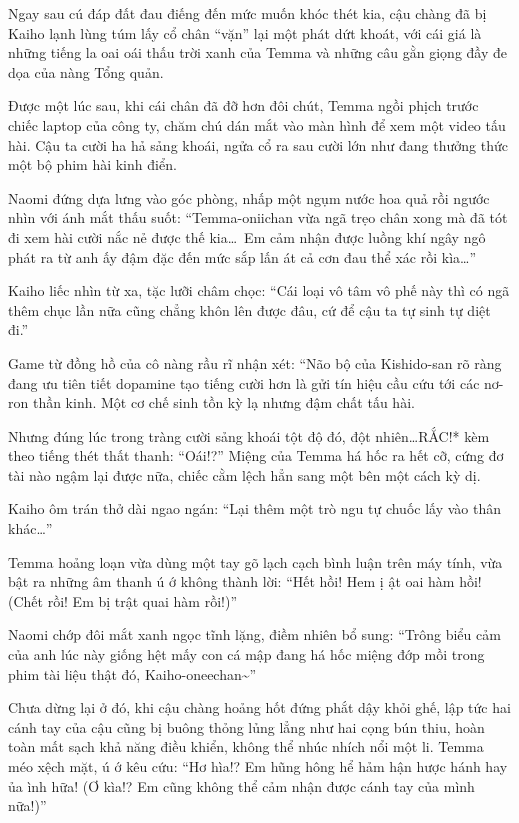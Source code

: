 \documentclass[../main.tex]{subfiles}
\begin{document}
Ngay sau cú đáp đất đau điếng đến mức muốn khóc thét kia, cậu chàng đã bị Kaiho lạnh lùng túm lấy cổ chân ``vặn'' lại một phát dứt khoát, với cái giá là những tiếng la oai oái thấu trời xanh của Temma và những câu gằn giọng đầy đe dọa của nàng Tổng quản.

Được một lúc sau, khi cái chân đã đỡ hơn đôi chút, Temma ngồi phịch trước chiếc laptop của công ty, chăm chú dán mắt vào màn hình để xem một video tấu hài. Cậu ta cười ha hả sảng khoái, ngửa cổ ra sau cười lớn như đang thưởng thức một bộ phim hài kinh điển.


Naomi đứng dựa lưng vào góc phòng, nhấp một ngụm nước hoa quả rồi ngước nhìn với ánh mắt thấu suốt: ``Temma-oniichan vừa ngã trẹo chân xong mà đã tót đi xem hài cười nắc nẻ được thế kia\dots\ Em cảm nhận được luồng khí ngây ngô phát ra từ anh ấy đậm đặc đến mức sắp lấn át cả cơn đau thể xác rồi kìa\dots''

Kaiho liếc nhìn từ xa, tặc lưỡi châm chọc: ``Cái loại vô tâm vô phế này thì có ngã thêm chục lần nữa cũng chẳng khôn lên được đâu, cứ để cậu ta tự sinh tự diệt đi.''

Game từ đồng hồ của cô nàng rầu rĩ nhận xét: ``Não bộ của Kishido-san rõ ràng đang ưu tiên tiết dopamine tạo tiếng cười hơn là gửi tín hiệu cầu cứu tới các nơ-ron thần kinh. Một cơ chế sinh tồn kỳ lạ nhưng đậm chất tấu hài.

Nhưng đúng lúc trong tràng cười sảng khoái tột độ đó, đột nhiên\dots *RẮC!* kèm theo tiếng thét thất thanh: ``Oái!?'' Miệng của Temma há hốc ra hết cỡ, cứng đơ tài nào ngậm lại được nữa, chiếc cằm lệch hẳn sang một bên một cách kỳ dị.

Kaiho ôm trán thở dài ngao ngán: ``Lại thêm một trò ngu tự chuốc lấy vào thân khác\dots''

Temma hoảng loạn vừa dùng một tay gõ lạch cạch bình luận trên máy tính, vừa bật ra những âm thanh ú ớ không thành lời: ``Hết hồi! Hem ị ật oai hàm hồi! (Chết rồi! Em bị trật quai hàm rồi!)''

Naomi chớp đôi mắt xanh ngọc tĩnh lặng, điềm nhiên bổ sung: ``Trông biểu cảm của anh lúc này giống hệt mấy con cá mập đang há hốc miệng đớp mồi trong phim tài liệu thật đó, Kaiho-oneechan\~{}''

Chưa dừng lại ở đó, khi cậu chàng hoảng hốt đứng phắt dậy khỏi ghế, lập tức hai cánh tay của cậu cũng bị buông thỏng lủng lẳng như hai cọng bún thiu, hoàn toàn mất sạch khả năng điều khiển, không thể nhúc nhích nổi một li. Temma méo xệch mặt, ú ớ kêu cứu: ``Hơ hìa!? Em hũng hông hể hảm hận hược hánh hay ủa ình hữa! (Ơ kìa!? Em cũng không thể cảm nhận được cánh tay của mình nữa!)''
\end{document}
